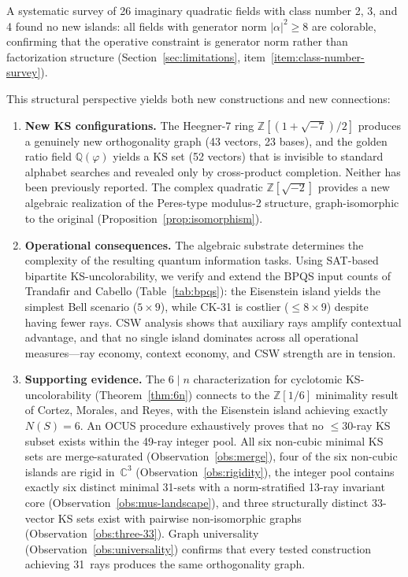 \documentclass[12pt,a4paper]{article}
\newcommand{\C}{\mathbb{C}}
\newcommand{\Z}{\mathbb{Z}}
\newcommand{\Q}{\mathbb{Q}}
\begin{document}
A systematic survey of 26 imaginary quadratic fields with class number 2, 3, and 4 found no new islands: all fields with generator norm $|\alpha|^2 \geq 8$ are colorable, confirming that the operative constraint is generator norm rather than factorization structure (Section~\ref{sec:limitations}, item~\ref{item:class-number-survey}).

This structural perspective yields both new constructions and new connections:

\begin{enumerate}
    \item \textbf{New KS configurations.} The Heegner-7 ring $\Z[(1+\sqrt{-7})/2]$ produces a genuinely new orthogonality graph (43 vectors, 23 bases), and the golden ratio field $\Q(\varphi)$ yields a KS set (52 vectors) that is invisible to standard alphabet searches and revealed only by cross-product completion. Neither has been previously reported. The complex quadratic $\Z[\sqrt{-2}]$ provides a new algebraic realization of the Peres-type modulus-2 structure, graph-isomorphic to the original (Proposition~\ref{prop:isomorphism}).

    \item \textbf{Operational consequences.} The algebraic substrate determines the complexity of the resulting quantum information tasks. Using SAT-based bipartite KS-uncolorability, we verify and extend the BPQS input counts of Trandafir and Cabello (Table~\ref{tab:bpqs}): the Eisenstein island yields the simplest Bell scenario ($5 \times 9$), while CK-31 is costlier ($\leq 8 \times 9$) despite having fewer rays. CSW analysis shows that auxiliary rays amplify contextual advantage, and that no single island dominates across all operational measures---ray economy, context economy, and CSW strength are in tension.

    \item \textbf{Supporting evidence.} The $6 \mid n$ characterization for cyclotomic KS-uncolorability (Theorem~\ref{thm:6n}) connects to the $\Z[1/6]$ minimality result of Cortez, Morales, and Reyes, with the Eisenstein island achieving exactly $N(S) = 6$.  An OCUS procedure exhaustively proves that no $\leq 30$-ray KS subset exists within the 49-ray integer pool.  All six non-cubic minimal KS sets are merge-saturated (Observation~\ref{obs:merge}), four of the six non-cubic islands are rigid in~$\C^3$ (Observation~\ref{obs:rigidity}), the integer pool contains exactly six distinct minimal 31-sets with a norm-stratified 13-ray invariant core (Observation~\ref{obs:mus-landscape}), and three structurally distinct 33-vector KS sets exist with pairwise non-isomorphic graphs (Observation~\ref{obs:three-33}).  Graph universality (Observation~\ref{obs:universality}) confirms that every tested construction achieving 31~rays produces the same orthogonality graph.
\end{enumerate}
\end{document}

